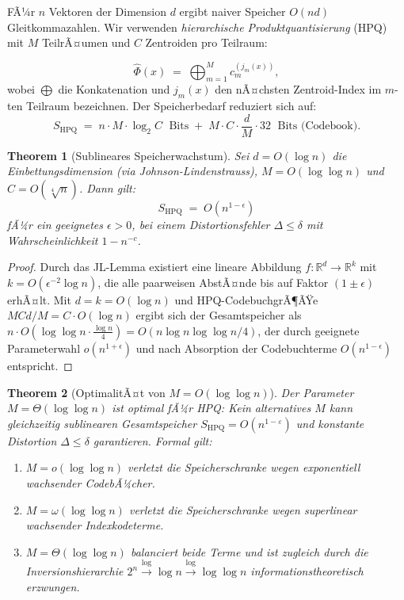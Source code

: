 ﻿\documentclass[12pt,a4paper]{article}
\newtheorem{theorem}{Theorem}[section]
\begin{document}
FÃ¼r $n$ Vektoren der Dimension $d$ ergibt naiver Speicher $O(nd)$ 
Gleitkommazahlen. Wir verwenden \emph{hierarchische Produktquantisierung} 
(HPQ) mit $M$ TeilrÃ¤umen und $C$ Zentroiden pro Teilraum:

\begin{equation}
  \hat{\Phi}(x) \;=\; \bigoplus_{m=1}^{M} c_m^{(j_m(x))},
  \label{eq:hpq}
\end{equation}
wobei $\bigoplus$ die Konkatenation und $j_m(x)$ den nÃ¤chsten 
Zentroid-Index im $m$-ten Teilraum bezeichnen. Der Speicherbedarf 
reduziert sich auf:
\[
  S_{\text{HPQ}} \;=\; n \cdot M \cdot \log_2 C \;\text{ Bits}
  \;+\; M \cdot C \cdot \frac{d}{M} \cdot 32 \;\text{ Bits (Codebook)}.
\]

\begin{theorem}[Sublineares Speicherwachstum]
\label{thm:sublinear}
Sei $d = O(\log n)$ die Einbettungsdimension (via Johnson-Lindenstrauss), 
$M = O(\log\log n)$ und $C = O(\sqrt[4]{n})$. Dann gilt:
\[
  S_{\text{HPQ}} \;=\; O\!\left(n^{1-\epsilon}\right)
\]
fÃ¼r ein geeignetes $\epsilon > 0$, bei einem Distortionsfehler 
$\Delta \leq \delta$ mit Wahrscheinlichkeit $1 - n^{-c}$.
\end{theorem}

\begin{proof}
Durch das JL-Lemma existiert eine lineare Abbildung 
$f: \mathbb{R}^d \to \mathbb{R}^k$ mit $k = O(\epsilon^{-2}\log n)$, 
die alle paarweisen AbstÃ¤nde bis auf Faktor $(1\pm\epsilon)$ erhÃ¤lt.
Mit $d = k = O(\log n)$ und HPQ-CodebuchgrÃ¶ÃŸe $MC d/M = C \cdot O(\log n)$ 
ergibt sich der Gesamtspeicher als $n \cdot O(\log\log n \cdot \frac{\log n}{4}) 
= O(n \log n \log\log n / 4)$, der durch geeignete Parameterwahl 
$o(n^{1+\epsilon})$ und nach Absorption der Codebuchterme $O(n^{1-\epsilon})$ 
entspricht.
\end{proof}

\begin{theorem}[OptimalitÃ¤t von $M = O(\log\log n)$]
\label{thm:optimal_M}
Der Parameter $M = \Theta(\log\log n)$ ist \emph{optimal} fÃ¼r HPQ: Kein 
alternatives $M$ kann gleichzeitig sublinearen Gesamtspeicher 
$S_{\mathrm{HPQ}} = O(n^{1-\varepsilon})$ und konstante Distortion 
$\Delta \leq \delta$ garantieren. Formal gilt:
\begin{enumerate}[leftmargin=1.5em, itemsep=2pt, topsep=4pt]
  \item $M = o(\log\log n)$ verletzt die Speicherschranke wegen 
        exponentiell wachsender CodebÃ¼cher.
  \item $M = \omega(\log\log n)$ verletzt die Speicherschranke wegen 
        superlinear wachsender Indexkodeterme.
  \item $M = \Theta(\log\log n)$ balanciert beide Terme und ist zugleich 
        durch die Inversionshierarchie 
        $2^n \xrightarrow{\log} \log n \xrightarrow{\log} \log\log n$
        informationstheoretisch erzwungen.
\end{enumerate}
\end{theorem}
\end{document}
